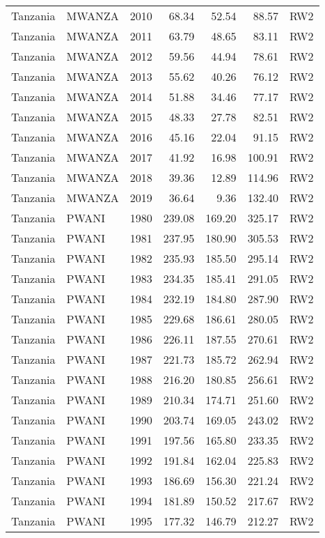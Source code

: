 \begin{longtable}{lllrrrl}
  Tanzania & MWANZA & 2010 & 68.34 & 52.54 & 88.57 & RW2 \\ 
  Tanzania & MWANZA & 2011 & 63.79 & 48.65 & 83.11 & RW2 \\ 
  Tanzania & MWANZA & 2012 & 59.56 & 44.94 & 78.61 & RW2 \\ 
  Tanzania & MWANZA & 2013 & 55.62 & 40.26 & 76.12 & RW2 \\ 
  Tanzania & MWANZA & 2014 & 51.88 & 34.46 & 77.17 & RW2 \\ 
  Tanzania & MWANZA & 2015 & 48.33 & 27.78 & 82.51 & RW2 \\ 
  Tanzania & MWANZA & 2016 & 45.16 & 22.04 & 91.15 & RW2 \\ 
  Tanzania & MWANZA & 2017 & 41.92 & 16.98 & 100.91 & RW2 \\ 
  Tanzania & MWANZA & 2018 & 39.36 & 12.89 & 114.96 & RW2 \\ 
  Tanzania & MWANZA & 2019 & 36.64 & 9.36 & 132.40 & RW2 \\ 
  Tanzania & PWANI & 1980 & 239.08 & 169.20 & 325.17 & RW2 \\ 
  Tanzania & PWANI & 1981 & 237.95 & 180.90 & 305.53 & RW2 \\ 
  Tanzania & PWANI & 1982 & 235.93 & 185.50 & 295.14 & RW2 \\ 
  Tanzania & PWANI & 1983 & 234.35 & 185.41 & 291.05 & RW2 \\ 
  Tanzania & PWANI & 1984 & 232.19 & 184.80 & 287.90 & RW2 \\ 
  Tanzania & PWANI & 1985 & 229.68 & 186.61 & 280.05 & RW2 \\ 
  Tanzania & PWANI & 1986 & 226.11 & 187.55 & 270.61 & RW2 \\ 
  Tanzania & PWANI & 1987 & 221.73 & 185.72 & 262.94 & RW2 \\ 
  Tanzania & PWANI & 1988 & 216.20 & 180.85 & 256.61 & RW2 \\ 
  Tanzania & PWANI & 1989 & 210.34 & 174.71 & 251.60 & RW2 \\ 
  Tanzania & PWANI & 1990 & 203.74 & 169.05 & 243.02 & RW2 \\ 
  Tanzania & PWANI & 1991 & 197.56 & 165.80 & 233.35 & RW2 \\ 
  Tanzania & PWANI & 1992 & 191.84 & 162.04 & 225.83 & RW2 \\ 
  Tanzania & PWANI & 1993 & 186.69 & 156.30 & 221.24 & RW2 \\ 
  Tanzania & PWANI & 1994 & 181.89 & 150.52 & 217.67 & RW2 \\ 
  Tanzania & PWANI & 1995 & 177.32 & 146.79 & 212.27 & RW2 \\ 

\end{longtable}
